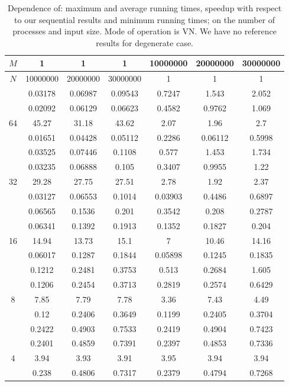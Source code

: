 \begin{table}[ht]
\centering
\begin{tabular}{c|c|c|c|c|c|c|}
\hline
$M$ & 1 & 1 & 1 & 10000000 & 20000000 & 30000000 \\
\hline
$N$ & 10000000 & 20000000 & 30000000 & 1 & 1 & 1 \\
\hline
 & 0.03178 & 0.06987 & 0.09543 & 0.7247 & 1.543 & 2.052 \\
 & 0.02092 & 0.06129 & 0.06623 & 0.4582 & 0.9762 & 1.069 \\
64 & 45.27 & 31.18 & 43.62 & 2.07 & 1.96 & 2.7 \\
 & 0.01651 & 0.04428 & 0.05112 & 0.2286 & 0.06112 & 0.5998 \\
\hline
 & 0.03525 & 0.07446 & 0.1108 & 0.577 & 1.453 & 1.734 \\
 & 0.03235 & 0.06888 & 0.105 & 0.3407 & 0.9955 & 1.22 \\
32 & 29.28 & 27.75 & 27.51 & 2.78 & 1.92 & 2.37 \\
 & 0.03127 & 0.06553 & 0.1014 & 0.03903 & 0.4486 & 0.6897 \\
\hline
 & 0.06565 & 0.1536 & 0.201 & 0.3542 & 0.208 & 0.2787 \\
 & 0.06341 & 0.1392 & 0.1913 & 0.1352 & 0.1827 & 0.204 \\
16 & 14.94 & 13.73 & 15.1 & 7 & 10.46 & 14.16 \\
 & 0.06017 & 0.1287 & 0.1844 & 0.05898 & 0.1245 & 0.1835 \\
\hline
 & 0.1212 & 0.2481 & 0.3753 & 0.513 & 0.2684 & 1.605 \\
 & 0.1206 & 0.2454 & 0.3713 & 0.2819 & 0.2574 & 0.6429 \\
8 & 7.85 & 7.79 & 7.78 & 3.36 & 7.43 & 4.49 \\
 & 0.12 & 0.2406 & 0.3649 & 0.1199 & 0.2405 & 0.3704 \\
\hline
 & 0.2422 & 0.4903 & 0.7533 & 0.2419 & 0.4904 & 0.7423 \\
 & 0.2401 & 0.4859 & 0.7391 & 0.2397 & 0.4853 & 0.7336 \\
4 & 3.94 & 3.93 & 3.91 & 3.95 & 3.94 & 3.94 \\
 & 0.238 & 0.4806 & 0.7317 & 0.2379 & 0.4794 & 0.7268 \\
\hline
\end{tabular}
\caption{Dependence of: maximum and average running times, speedup with respect to our sequential results and minimum running times; on the number of processes and input size. Mode of operation is VN. We have no reference results for degenerate case.}
\end{table}

